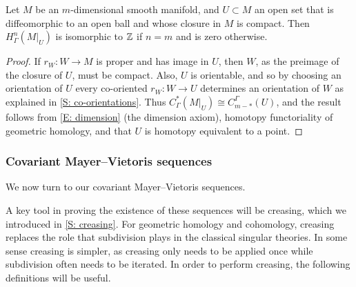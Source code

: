 \begin{proposition}\label{P: P lemma}
	Let $M$ be an $m$-dimensional smooth manifold, and $U \subset M$ an open set that is diffeomorphic to an open ball and whose closure in $M$ is compact.
	Then $H^n_\Gamma(M|_U)$ is isomorphic to $\mathbb{Z}$ if $n = m$ and is zero otherwise.
\end{proposition}


\begin{proof}
	If $r_W \colon W \to M$ is proper and has image in $U$, then $W$, as the preimage of the closure of $U$, must be compact.
	Also, $U$ is orientable, and so by choosing an orientation of $U$ every co-oriented $r_W \colon W \to U$ determines an orientation of $W$ as explained in \cref{S: co-orientations}.
	Thus $C^*_\Gamma(M|_U) \cong C_{m-*}^\Gamma(U)$, and the result follows from \cref{E: dimension} (the dimension axiom), homotopy functoriality of geometric homology, and that $U$ is homotopy equivalent to a point.
\end{proof}



\subsubsection{Covariant Mayer--Vietoris sequences}

We now turn to our covariant Mayer--Vietoris sequences.


A key tool in proving the existence of these sequences will be creasing, which we introduced in \cref{S: creasing}.
For geometric homology and cohomology, creasing replaces the role that subdivision plays in the classical singular theories.
In some sense creasing is simpler, as creasing only needs to be applied once while subdivision often needs to be iterated.
In order to perform creasing, the following definitions will be useful.

